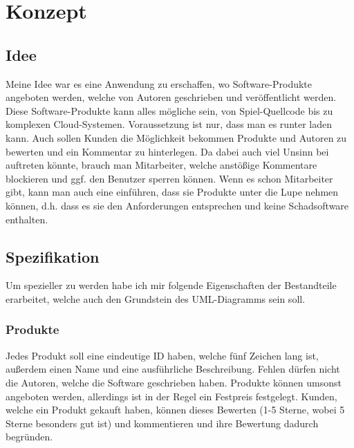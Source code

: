 \chapter{Konzept}

\section{Idee}
Meine Idee war es eine Anwendung zu erschaffen, wo Software-Produkte angeboten werden, welche von Autoren geschrieben und veröffentlicht werden. Diese Software-Produkte kann alles mögliche sein, von Spiel-Quellcode bis zu komplexen Cloud-Systemen. Voraussetzung ist nur, dass man es runter laden kann.
Auch sollen Kunden die Möglichkeit bekommen Produkte und Autoren zu bewerten und ein Kommentar zu hinterlegen. Da dabei auch viel Unsinn bei auftreten könnte, brauch man Mitarbeiter, welche anstößige Kommentare blockieren und ggf. den Benutzer sperren können. Wenn es schon Mitarbeiter gibt, kann man auch eine einführen, dass sie Produkte unter die Lupe nehmen können, d.h. dass es sie den Anforderungen entsprechen und keine Schadsoftware enthalten.

\section{Spezifikation}
Um spezieller zu werden habe ich mir folgende Eigenschaften der Bestandteile erarbeitet, welche auch den Grundstein des UML-Diagramms sein soll.

\subsection{Produkte}
Jedes Produkt soll eine eindeutige ID haben, welche fünf Zeichen lang ist, außerdem einen Name und eine ausführliche Beschreibung. Fehlen dürfen nicht die Autoren, welche die Software geschrieben haben. Produkte können umsonst angeboten werden, allerdings ist in der Regel ein Festpreis festgelegt. Kunden, welche ein Produkt gekauft haben, können dieses Bewerten (1-5 Sterne, wobei 5 Sterne besonders gut ist) und kommentieren und ihre Bewertung dadurch begründen.

